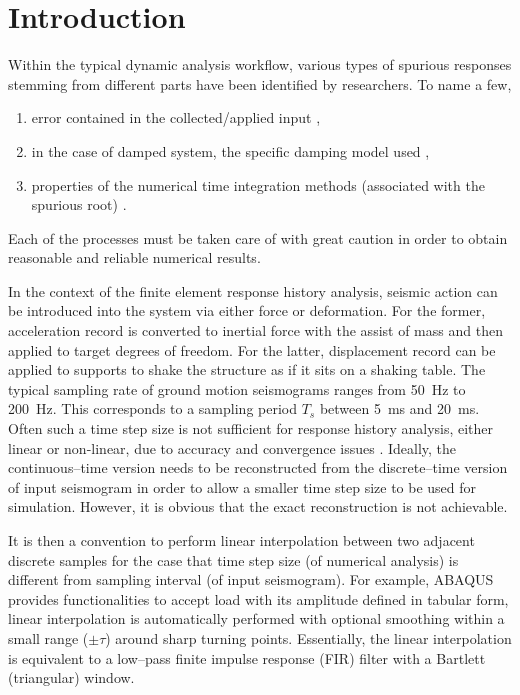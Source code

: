 \section{Introduction}
Within the typical dynamic analysis workflow, various types of spurious responses stemming from different parts have been identified by researchers. To name a few,
\begin{enumerate}
\item error contained in the collected/applied input \citep{Shing1987},
\item in the case of damped system, the specific damping model used \citep{Hall2006,Jehel2014,Chopra2015},
\item properties of the numerical time integration methods (associated with the spurious root) \citep{Hulbert1994}.
\end{enumerate}
Each of the processes must be taken care of with great caution in order to obtain reasonable and reliable numerical results.

In the context of the finite element response history analysis, seismic action can be introduced into the system via either force or deformation. For the former, acceleration record is converted to inertial force with the assist of mass and then applied to target degrees of freedom. For the latter, displacement record can be applied to supports to shake the structure as if it sits on a shaking table.
The typical sampling rate of ground motion seismograms ranges from \SI{50}{\hertz} to \SI{200}{\hertz}. This corresponds to a sampling period $T_s$ between \SI{5}{\milli\second} and \SI{20}{\milli\second}. Often such a time step size is not sufficient for response history analysis, either linear or non-linear, due to accuracy and convergence issues \citep[see, e.g.,][]{Chang2011,Rossi2014}. Ideally, the continuous--time version needs to be reconstructed from the discrete--time version of input seismogram in order to allow a smaller time step size to be used for simulation. However, it is obvious that the exact reconstruction is not achievable.

It is then a convention to perform linear interpolation between two adjacent discrete samples for the case that time step size (of numerical analysis) is different from sampling interval (of input seismogram). For example, ABAQUS \citep[see][\S34.1.2]{ABAQUS2014} provides functionalities to accept load with its amplitude defined in tabular form, linear interpolation is automatically performed with optional smoothing within a small range ($\pm\tau$) around sharp turning points. Essentially, the linear interpolation is equivalent to a low--pass finite impulse response (FIR) filter with a Bartlett (triangular) window.

